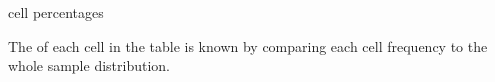 \documentclass[t]{beamer}
\begin{document}
	\begin{frame}[t]{ cell percentages}
	
	
	The  of each cell in the table is known by comparing each cell frequency to the whole sample distribution.
	
	\end{frame}
	
\end{document}
